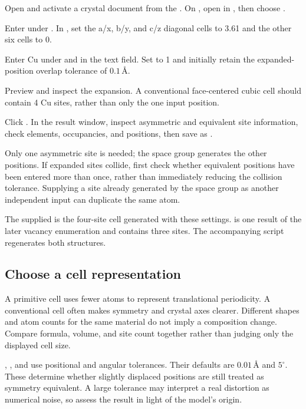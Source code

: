 \begin{steps}
  \item Open and activate a crystal document from the . On , open  in , then choose .
  \item Enter  under . In , set the a/x, b/y, and c/z diagonal cells to 3.61 and the other six cells to 0.
  \item Enter Cu under  and  in the  text field. Set  to 1 and initially retain the expanded-position overlap tolerance of $0.1\,\text{\AA}$.
  \item Preview and inspect the expansion. A conventional face-centered cubic cell should contain 4 Cu sites, rather than only the one input position.
  \item Click . In the result window, inspect asymmetric and equivalent site information, check elements, occupancies, and positions, then save as .
\end{steps}

Only one asymmetric site is needed; the space group generates the other positions. If expanded sites collide, first check whether equivalent positions have been entered more than once, rather than immediately reducing the collision tolerance. Supplying a site already generated by the space group as another independent input can duplicate the same atom.

The supplied  is the four-site cell generated with these settings.  is one result of the later vacancy enumeration and contains three sites. The accompanying script regenerates both structures.

\subsection{Choose a cell representation}

A primitive cell uses fewer atoms to represent translational periodicity. A conventional cell often makes symmetry and crystal axes clearer. Different shapes and atom counts for the same material do not imply a composition change. Compare formula, volume, and site count together rather than judging only the displayed cell size.

, , and  use positional and angular tolerances. Their defaults are $0.01\,\text{\AA}$ and $5^\circ$. These determine whether slightly displaced positions are still treated as symmetry equivalent. A large tolerance may interpret a real distortion as numerical noise, so assess the result in light of the model's origin.

